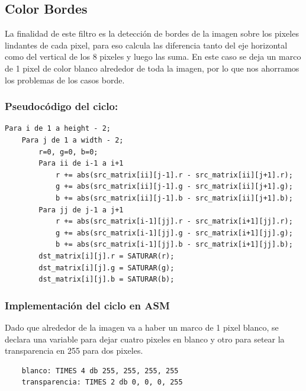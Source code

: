 \subsection{Color Bordes}
La finalidad de este filtro es la detección de bordes de la imagen sobre los pixeles lindantes de cada pixel, para eso calcula las diferencia tanto del eje horizontal como del vertical de los 8 pixeles y luego las suma. En este caso se deja un marco de 1 pixel de color blanco alrededor de toda la imagen, por lo que nos ahorramos los problemas de los casos borde.

\subsubsection{Pseudocódigo del ciclo:}
\begin{codesnippet}
\begin{verbatim}
Para i de 1 a height - 2;
    Para j de 1 a width - 2; 
        r=0, g=0, b=0;
        Para ii de i-1 a i+1
            r += abs(src_matrix[ii][j-1].r - src_matrix[ii][j+1].r);
            g += abs(src_matrix[ii][j-1].g - src_matrix[ii][j+1].g);
            b += abs(src_matrix[ii][j-1].b - src_matrix[ii][j+1].b);
        Para jj de j-1 a j+1
            r += abs(src_matrix[i-1][jj].r - src_matrix[i+1][jj].r);
            g += abs(src_matrix[i-1][jj].g - src_matrix[i+1][jj].g);
            b += abs(src_matrix[i-1][jj].b - src_matrix[i+1][jj].b);
        dst_matrix[i][j].r = SATURAR(r);
        dst_matrix[i][j].g = SATURAR(g);
        dst_matrix[i][j].b = SATURAR(b);
\end{verbatim}
\end{codesnippet}

\subsubsection{Implementación del ciclo en ASM}

Dado que alrededor de la imagen va a haber un marco de 1 pixel blanco, se declara una variable para dejar cuatro pixeles en blanco y otro para setear la transparencia en 255 para dos pixeles.
\begin{codesnippet}
\begin{verbatim}   
    blanco: TIMES 4 db 255, 255, 255, 255
    transparencia: TIMES 2 db 0, 0, 0, 255
\end{verbatim}
\end{codesnippet}

